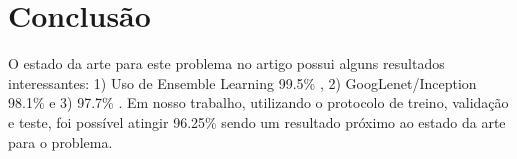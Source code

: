 \documentclass{sigchi}
\begin{document}
\section{Conclusão}
O estado da arte para este problema no artigo \cite{rajaraman2019performance} possui alguns resultados interessantes: 1) Uso de Ensemble Learning 99.5\% \cite{rajaraman2019performance}, 2) GoogLenet/Inception 98.1\% \cite{dong2017evaluations} e 3) 97.7\% \cite{gopakumar2018convolutional}. Em nosso trabalho, utilizando o protocolo de treino, validação e teste, foi possível atingir 96.25\% sendo um resultado próximo ao estado da arte para o problema. 

\balance{}



\end{document}
